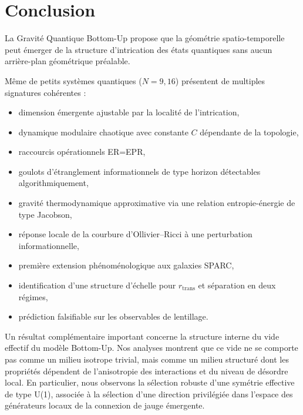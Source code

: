\documentclass[11pt]{article}
\begin{document}

\section{Conclusion}

La Gravité Quantique Bottom-Up propose que la géométrie spatio-temporelle peut émerger de la structure d'intrication des états quantiques sans aucun arrière-plan géométrique préalable.

Même de petits systèmes quantiques ($N=9,16$) présentent de multiples signatures cohérentes :

\begin{itemize}
\item dimension émergente ajustable par la localité de l'intrication,
\item dynamique modulaire chaotique avec constante $C$ dépendante de la topologie,
\item raccourcis opérationnels ER=EPR,
\item goulots d'étranglement informationnels de type horizon détectables algorithmiquement,
\item gravité thermodynamique approximative via une relation entropie-énergie de type Jacobson,
\item réponse locale de la courbure d'Ollivier--Ricci à une perturbation informationnelle,
\item première extension phénoménologique aux galaxies SPARC,
\item identification d'une structure d'échelle pour $r_{\mathrm{trans}}$ et séparation en deux régimes,
\item prédiction falsifiable sur les observables de lentillage.
\end{itemize}

\bigskip

Un résultat complémentaire important concerne la structure interne du vide effectif du modèle Bottom-Up. Nos analyses montrent que ce vide ne se comporte pas comme un milieu isotrope trivial, mais comme un milieu structuré dont les propriétés dépendent de l'anisotropie des interactions et du niveau de désordre local. En particulier, nous observons la sélection robuste d'une symétrie effective de type U(1), associée à la sélection d'une direction privilégiée dans l'espace des générateurs locaux de la connexion de jauge émergente.
\end{document}

